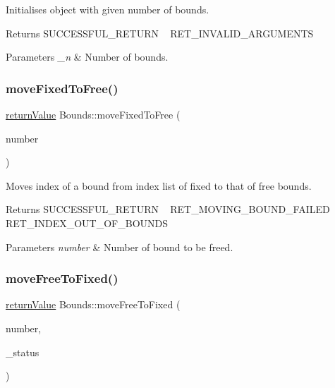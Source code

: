 Initialises object with given number of bounds. \begin{DoxyReturn}{Returns}
S\+U\+C\+C\+E\+S\+S\+F\+U\+L\+\_\+\+R\+E\+T\+U\+RN ~\newline
 R\+E\+T\+\_\+\+I\+N\+V\+A\+L\+I\+D\+\_\+\+A\+R\+G\+U\+M\+E\+N\+TS 
\end{DoxyReturn}

\begin{DoxyParams}{Parameters}
{\em \+\_\+n} & Number of bounds. \\
\hline
\end{DoxyParams}
\mbox{\label{class_bounds_a3ba36cd0625c609e01547f6412e52419}} 
\subsubsection{\texorpdfstring{move\+Fixed\+To\+Free()}{moveFixedToFree()}}
{\footnotesize\ttfamily \hyperlink{_message_handling_8hpp_a81d556f613bfbabd0b1f9488c0fa865e}{return\+Value} Bounds\+::move\+Fixed\+To\+Free (\begin{DoxyParamCaption}\item[{\hyperlink{_types_8hpp_ab6fd6105e64ed14a0c9281326f05e623}{int\+\_\+t}}]{number }\end{DoxyParamCaption})}

Moves index of a bound from index list of fixed to that of free bounds. \begin{DoxyReturn}{Returns}
S\+U\+C\+C\+E\+S\+S\+F\+U\+L\+\_\+\+R\+E\+T\+U\+RN ~\newline
 R\+E\+T\+\_\+\+M\+O\+V\+I\+N\+G\+\_\+\+B\+O\+U\+N\+D\+\_\+\+F\+A\+I\+L\+ED ~\newline
 R\+E\+T\+\_\+\+I\+N\+D\+E\+X\+\_\+\+O\+U\+T\+\_\+\+O\+F\+\_\+\+B\+O\+U\+N\+DS 
\end{DoxyReturn}

\begin{DoxyParams}{Parameters}
{\em number} & Number of bound to be freed. \\
\hline
\end{DoxyParams}
\mbox{\label{class_bounds_aab5c2198d2ad6e57fd1d7ab513f1b894}} 
\subsubsection{\texorpdfstring{move\+Free\+To\+Fixed()}{moveFreeToFixed()}}
{\footnotesize\ttfamily \hyperlink{_message_handling_8hpp_a81d556f613bfbabd0b1f9488c0fa865e}{return\+Value} Bounds\+::move\+Free\+To\+Fixed (\begin{DoxyParamCaption}\item[{\hyperlink{_types_8hpp_ab6fd6105e64ed14a0c9281326f05e623}{int\+\_\+t}}]{number,  }\item[{\hyperlink{_types_8hpp_a70a6a40d261a015ead8d43aa589383a4}{Subject\+To\+Status}}]{\+\_\+status }\end{DoxyParamCaption})}

